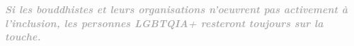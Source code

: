 \documentclass[12pt,openany]{book}
\renewenvironment{quote}{%
  \list{}{%
    \leftmargin-0.1cm   %
    \rightmargin\leftmargin
  }
  \item\relax
}
{\endlist}
\begin{document}
\begin{figure}[h]
    \centering
\end{figure}

\newpage
\thispagestyle{empty}
\begin{figure}[h]
    \centering
\end{figure}

\begin{quote}
\centering
\doublespacing
\textit{\Large \textbf{\textcolor{darkgray}{Si les bouddhistes et leurs organisations n’oeuvrent pas activement à l’inclusion, les personnes \mbox{LGBTQIA+} resteront toujours sur la touche.}}}
\end{quote}
\end{document}
